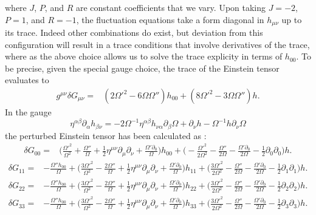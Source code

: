 \documentclass[10pt,letterpaper]{article}
\begin{document}
where $J$, $P$, and $R$ are constant coefficients that we vary. Upon taking $J = -2$, $P = 1$, and $R = -1$, the fluctuation equations take a form diagonal in $h_{\mu\nu}$ up to its trace. Indeed other combinations do exist, but deviation from this configuration will result in a trace conditions that involve derivatives of the trace, where as the above choice allows us to solve the trace explicity in terms of $h_{00}$. To be precise, given the special gauge choice, the trace of the Einstein tensor evaluates to
\begin{align}
g^{\mu\nu}\delta G_{\mu\nu}={}&(2 \Omega '^2
 - 6 \Omega \Omega '') h_{00}
 + (8 \Omega '^2
 - 3 \Omega \Omega '') h.
\end{align}
In the gauge
\begin{equation}
	\eta^{\alpha\beta}\partial_{\alpha}h_{\beta\nu} = -2 \Omega^{-1}  \eta^{\alpha\beta}h_{\nu\alpha}\partial_\beta \Omega +  \partial_\nu h - \Omega^{-1} h \partial_\nu \Omega
\end{equation}
the perturbed Einstein tensor has been calculated as :
\begin{align}
\delta G_{00} ={}&\bigg(\frac{\Omega '^2}{\Omega^2}
 + \frac{\Omega ''}{\Omega}
 + \tfrac{1}{2} \eta^{\mu \nu} \partial_{\mu} \partial_{\nu}
 + \frac{\Omega ' \partial_{0}}{\Omega}\bigg) h_{00}
 + \bigg(- \frac{\Omega '^2}{2 \Omega^2}
 -  \frac{\Omega ''}{2 \Omega}
 -  \frac{\Omega ' \partial_{0}}{2 \Omega}
 -  \tfrac{1}{2} \partial_{0} \partial_{0}\bigg) h.
\end{align}
\begin{align}
\delta G_{11}={}&- \frac{\Omega '' h_{00}}{\Omega}
 + \bigg(\frac{3 \Omega '^2}{\Omega^2}
 -  \frac{2 \Omega ''}{\Omega}
 + \tfrac{1}{2} \eta^{\mu \nu} \partial_{\mu} \partial_{\nu}
 + \frac{\Omega ' \partial_{0}}{\Omega}\bigg) h_{11}
 + \bigg(\frac{3 \Omega '^2}{2 \Omega^2}
 -  \frac{\Omega ''}{2 \Omega}
 -  \frac{\Omega ' \partial_{0}}{2 \Omega}
 -  \tfrac{1}{2} \partial_{1} \partial_{1}\bigg) h.
\end{align}
\begin{align}
\delta G_{22}={}&- \frac{\Omega '' h_{00}}{\Omega}
 + \bigg(\frac{3 \Omega '^2}{\Omega^2}
 -  \frac{2 \Omega ''}{\Omega}
 + \tfrac{1}{2} \eta^{\mu \nu} \partial_{\mu} \partial_{\nu}
 + \frac{\Omega ' \partial_{0}}{\Omega}\bigg) h_{22}
 + \bigg(\frac{3 \Omega '^2}{2 \Omega^2}
 -  \frac{\Omega ''}{2 \Omega}
 -  \frac{\Omega ' \partial_{0}}{2 \Omega}
 -  \tfrac{1}{2} \partial_{2} \partial_{2}\bigg) h.
\end{align}
\begin{align}
\delta G_{33}={}&- \frac{\Omega '' h_{00}}{\Omega}
 + \bigg(\frac{3 \Omega '^2}{\Omega^2}
 -  \frac{2 \Omega ''}{\Omega}
 + \tfrac{1}{2} \eta^{\mu \nu} \partial_{\mu} \partial_{\nu}
 + \frac{\Omega ' \partial_{0}}{\Omega}\bigg) h_{33}
 + \bigg(\frac{3 \Omega '^2}{2 \Omega^2}
 -  \frac{\Omega ''}{2 \Omega}
 -  \frac{\Omega ' \partial_{0}}{2 \Omega}
 -  \tfrac{1}{2} \partial_{3} \partial_{3}\bigg) h.
\end{align}
\end{document}
